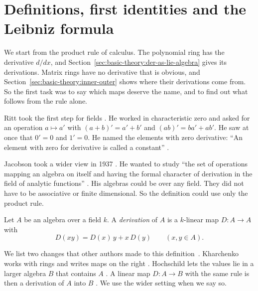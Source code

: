 \section{Definitions, first identities and the Leibniz formula}\label{sec:basic-theory:definitions}

We start from the product rule of calculus. The polynomial ring has the
derivative $d/dx$, and Section~\ref{sec:basic-theory:der-as-lie-algebra} gives
its derivations. Matrix rings have no derivative that is obvious, and
Section~\ref{sec:basic-theory:inner-outer} shows where their derivations come
from. So the first task was to say which maps deserve the name, and to find
out what follows from the rule alone.

Ritt took the first step for fields \cite[p.~1]{Ritt1950}. He worked in
characteristic zero and asked for an operation $a \mapsto a'$ with
$(a+b)' = a'+b'$ and $(ab)' = ba' + ab'$. He saw at once that $0' = 0$ and
$1' = 0$. He named the elements with zero derivative: ``An element with zero
for derivative is called a constant'' \cite[p.~1]{Ritt1950}.

Jacobson took a wider view in 1937 \cite[p.~206]{Jacobson1937}. He wanted to
study ``the set of operations mapping an algebra on itself and having the
formal character of derivation in the field of analytic functions''
\cite[p.~206]{Jacobson1937}. His algebras could be over any field. They did
not have to be associative or finite dimensional. So the definition could use
only the product rule.

\begin{definition}\label{def:basic:derivation}
Let $A$ be an algebra over a field $k$. A \emph{derivation} of $A$ is a
$k$-linear map $D\colon A \to A$ with
\[
D(xy) = D(x)\,y + x\,D(y) \qquad (x, y \in A).
\]
\end{definition}

We list two changes that other authors made to this definition~\cite[Definition~3.1,
p.~688]{Hochschild1942}. Kharchenko
works with rings and writes maps on the right \cite[p.~7]{Kharchenko1991}.
Hochschild lets the values lie in a larger algebra $B$ that contains $A$
\cite[p.~688]{Hochschild1942}. A linear map $D\colon A \to B$ with the same
rule is then a derivation of $A$ into $B$ \cite[Definition~3.1,
p.~688]{Hochschild1942}. We use the wider setting when we say so.

